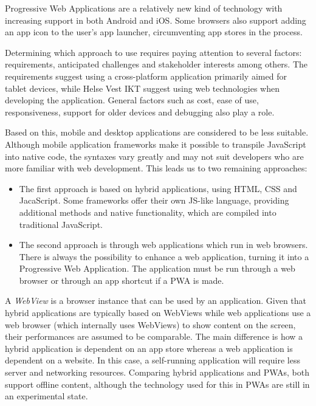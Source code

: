 Progressive Web Applications are a relatively new kind of technology with increasing support in both Android and iOS. Some browsers also support adding an app icon to the user's app launcher, circumventing app stores in the process.


Determining which approach to use requires paying attention to several factors: requirements, anticipated challenges and stakeholder interests among others. The requirements suggest using a cross-platform application primarily aimed for tablet devices, while Helse Vest IKT suggest using web technologies when developing the application. General factors such as cost, ease of use, responsiveness, support for older devices and debugging also play a role. 

Based on this, mobile and desktop applications are considered to be less suitable. Although mobile application frameworks make it possible to transpile JavaScript into native code, the syntaxes vary greatly and may not suit developers who are more familiar with web development. This leads us to two remaining approaches:

\begin{itemize}
    \item The first approach is based on hybrid applications, using HTML, CSS and JacaScript. Some frameworks offer their own JS-like language, providing additional methods and native functionality, which are compiled into traditional JavaScript.
    \item The second approach is through web applications which run in web browsers. There is always the possibility to enhance a web application, turning it into a Progressive Web Application. The application must be run through a web browser or through an app shortcut if a PWA is made.
\end{itemize}


A \emph{WebView} is a browser instance that can be used by an application.
Given that hybrid applications are typically based on WebViews while web applications use a web browser (which internally uses WebViews) to show content on the screen, their performances are assumed to be comparable. The main difference is how a hybrid application is dependent on an app store whereas a web application is dependent on a website. In this case, a self-running application will require less server and networking resources. Comparing hybrid applications and PWAs, both support offline content, although the technology used for this in PWAs are still in an experimental state.

